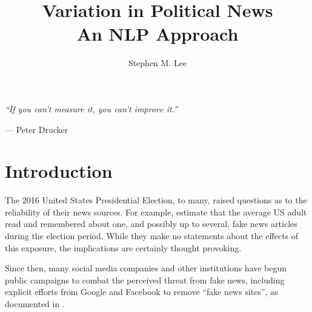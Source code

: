 \documentclass{article}
\author{Stephen M. Lee}
\title{Variation in Political News \\ \large{An NLP Approach}}
\begin{document}
	
	\maketitle 
	
	\newpage
	
		
	\newpage
	
	\tableofcontents
	
	\newpage
	
	
	\vspace{2\baselineskip}
	\begin{center}
		\textit{``If you can't measure it, you can't improve it.''}
	\end{center}
	\begin{flushright}
		--- Peter Drucker
	\end{flushright}

	\vspace{2\baselineskip}
	
	\section{Introduction}
	
		The 2016 United States Presidential Election, to many, raised questions as to the reliability of their news sources. For example, \citet{allcott2017social} estimate that the average US adult read and remembered about one, and possibly up to several, fake news articles during the election period. While they make no statements about the effects of this exposure, the implications are certainly thought provoking. 
		
		Since then, many social media companies and other institutions have begun public campaigns to combat the perceived threat from fake news, including explicit efforts from Google and Facebook to remove ``fake news sites'', as documented in \citet{allcott2017social}. 
		
\end{document}
